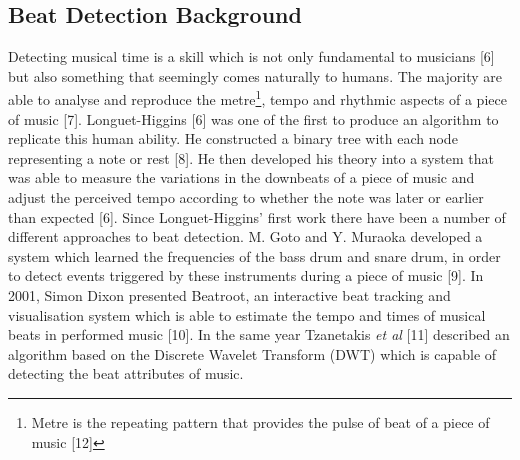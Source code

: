 \documentclass[a4paper, 11pt]{article}
\begin{document}
\subsection{Beat Detection Background}

Detecting musical time is a skill which is not only fundamental to musicians [6] but also something that seemingly comes naturally to humans. The majority are able to analyse and reproduce the metre\footnote{Metre is the repeating pattern that provides the pulse of beat of a piece of music [12]}, tempo and rhythmic aspects of a piece of music [7]. Longuet-Higgins [6] was one of the first to produce an algorithm to replicate this human ability. He constructed a binary tree with each node representing a note or rest [8]. He then developed his theory into a system that was able to measure the variations in the downbeats of a piece of music and adjust the perceived tempo according to whether the note was later or earlier than expected [6]. Since Longuet-Higgins' first work there have been a number of different approaches to beat detection. M. Goto and Y. Muraoka developed a system which learned the frequencies of the bass drum and snare drum, in order to detect events triggered by these instruments during a piece of music [9]. In 2001, Simon Dixon presented Beatroot, an interactive beat tracking and visualisation system which is able to estimate the tempo and times of musical beats in performed music [10]. In the same year Tzanetakis \textit{et al} [11] described an algorithm based on the Discrete Wavelet Transform (DWT) which is capable of detecting the beat attributes of music. 


\end{document}
